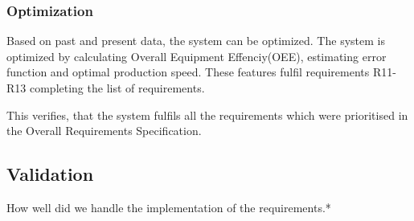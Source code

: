\subsubsection{Optimization}
Based on past and present data, the system can be optimized. The system is 
optimized by calculating Overall Equipment Effenciy(OEE), estimating error 
function and optimal production speed. These features fulfil requirements 
R11-R13 completing the list of requirements.

This verifies, that the system fulfils all the requirements which were 
prioritised in the Overall Requirements Specification.

\subsection{Validation}
How well did we handle the implementation of the requirements.*

